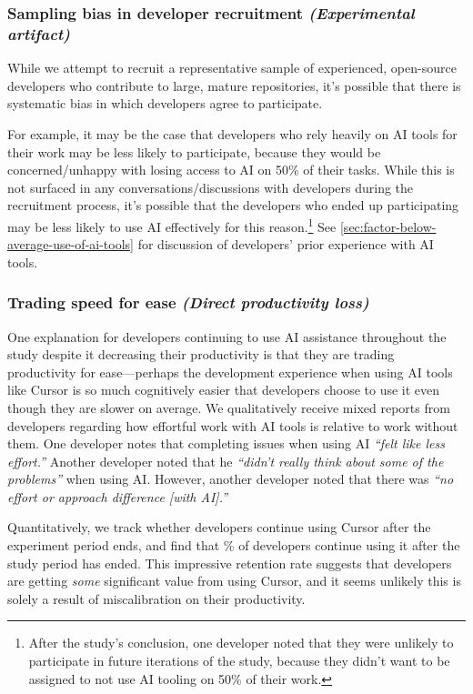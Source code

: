 \documentclass{article}
\newcommand{\devquote}[1]{\textcolor{quotecolor}{\textit{``#1''}}}
\begin{document}
\subsubsection{Sampling bias in developer recruitment \textnormal{\textit{(Experimental artifact)}}}
\label{sec:factor-developer-sampling-bias}

While we attempt to recruit a representative sample of experienced, open-source developers who contribute to large, mature repositories, it's possible that there is systematic bias in which developers agree to participate. 

For example, it may be the case that developers who rely heavily on AI tools for their work may be less likely to participate, because they would be concerned/unhappy with losing access to AI on 50\% of their tasks. While this is not surfaced in any conversations/discussions with developers during the recruitment process, it's possible that the developers who ended up participating may be less likely to use AI effectively for this reason.\footnote{After the study's conclusion, one developer noted that they were unlikely to participate in future iterations of the study, because they didn't want to be assigned to not use AI tooling on 50\% of their work.} See \autoref{sec:factor-below-average-use-of-ai-tools} for discussion of developers' prior experience with AI tools.


\subsubsection{Trading speed for ease \textnormal{\textit{(Direct productivity loss)}}}
\label{sec:factor-productivity-for-leisure}


One explanation for developers continuing to use AI assistance throughout the study despite it decreasing their productivity is that they are trading productivity for ease---perhaps the development experience when using AI tools like Cursor is so much cognitively easier that developers choose to use it even though they are slower on average. 
We qualitatively receive mixed reports from developers regarding how effortful work with AI tools is relative to work without them. One developer notes that completing issues when using AI \devquote{felt like less effort.} Another developer noted that he 
\devquote{didn’t really think about some of the problems} when using AI. However, another developer noted that there was \devquote{no effort or approach difference [with AI].}

Quantitatively, we track whether developers continue using Cursor after the experiment period ends, and find that \PctDevelopersUsedCursorAfterExperiment\% of developers continue using it after the study period has ended.
This impressive retention rate suggests that developers are getting \textit{some} significant value from using Cursor, and it seems unlikely this is solely a result of miscalibration on their productivity.
\end{document}

